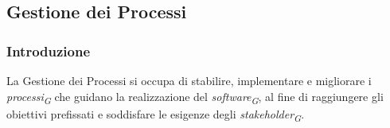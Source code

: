 \subsection{Gestione dei Processi}

\subsubsection{Introduzione}
La Gestione dei Processi si occupa di stabilire, implementare e migliorare i \textit{processi}\textsubscript{\textit{G}} che guidano la realizzazione del \textit{software}\textsubscript{\textit{G}}, al fine di raggiungere gli obiettivi prefissati e soddisfare le esigenze degli \textit{stakeholder}\textsubscript{\textit{G}}.

\vspace{0.2cm}

